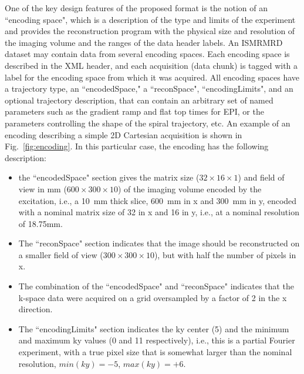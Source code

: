 \documentclass[12pt]{article}
\begin{document}
One of the key design features of the proposed format is the notion of an ``encoding space", which is a description of the type and limits of the experiment and provides the reconstruction program with the physical size and resolution of the imaging volume and the ranges of the data header labels.  An ISMRMRD dataset may contain data from several encoding spaces.  Each encoding space is described in the XML header, and each acquisition (data chunk) is tagged with a label for the encoding space from which it was acquired. All encoding spaces have a trajectory type, an ``encodedSpace," a ``reconSpace", ``encodingLimits", and an optional trajectory description, that can contain an arbitrary set of named parameters such as the gradient ramp and flat top times for EPI, or the parameters controlling the shape of the spiral trajectory, etc.  An example of an encoding describing a simple 2D Cartesian acquisition is shown in Fig.~\ref{fig:encoding}.  In this particular case, the encoding has the following description:
\begin{itemize}
\item the ``encodedSpace" section gives the matrix size ($32\times16\times1$) and field of view in mm ($600\times300\times10$) of the imaging volume encoded by the excitation, i.e.,  a 10~mm thick slice, 600~mm in x and 300~mm in y, encoded with a nominal matrix size of 32 in x and 16 in y, i.e., at a nominal resolution of 18.75mm.
\item The ``reconSpace" section indicates that the image should be reconstructed on a smaller field of view ($300\times300\times10$), but with half the number of pixels in x.
\item The combination of the ``encodedSpace" and ``reconSpace" indicates that the k-space data were acquired on a grid oversampled by a factor of 2 in the x direction.
\item The ``encodingLimits" section indicates the ky center (5) and the minimum and maximum ky values (0 and 11 respectively), i.e., this is a partial Fourier experiment, with a true pixel size that is somewhat larger than the nominal resolution, $min(ky)=-5$, $max(ky)=+6$.
\end{itemize}
\end{document}
